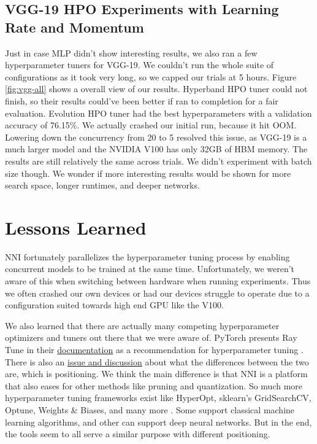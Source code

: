 \documentclass{article}
\begin{document}
\subsection{VGG-19 HPO Experiments with Learning Rate and Momentum}
Just in case MLP didn't show interesting results, we also ran a few hyperparameter tuners for VGG-19. We couldn't run the whole suite of configurations as it took very long, so we capped our trials at 5 hours. Figure \ref{fig:vgg-all} shows a overall view of our results. Hyperband HPO tuner could not finish, so their results could've been better if ran to completion for a fair evaluation. Evolution HPO tuner had the best hyperparameters with a validation accuracy of 76.15\%. We actually crashed our initial run, because it hit OOM. Lowering down the concurrency from 20 to 5 resolved this issue, as VGG-19 is a much larger model and the NVIDIA V100 has only 32GB of HBM memory. The results are still relatively the same across trials. We didn't experiment with batch size though. We wonder if more interesting results would be shown for more search space, longer runtimes, and deeper networks.

\section{Lessons Learned}
NNI fortunately parallelizes the hyperparameter tuning process by enabling concurrent models to be trained at the same time. Unfortunately, we weren't aware of this when switching between hardware when running experiments. Thus we often crashed our own devices or had our devices struggle to operate due to a configuration suited towards high end GPU like the V100.

We also learned that there are actually many competing hyperparameter optimizers and tuners out there that we were aware of. PyTorch presents Ray Tune in their \href{https://pytorch.org/tutorials/beginner/hyperparameter_tuning_tutorial.html}{documentation} as a recommendation for hyperparameter tuning \cite{ray-tune}. There is also an \href{https://github.com/microsoft/nni/issues/1743}{issue and discussion} about what the differences between the two are, which is positioning. We think the main difference is that NNI is a platform that also eases for other methods like pruning and quantization. So much more hyperparameter tuning frameworks exist like HyperOpt, sklearn's GridSearchCV, Optune, Weights \& Biases, and many more \cite{hyperopt, sklearn_api, optuna}. Some support classical machine learning algorithms, and other can support deep neural networks. But in the end, the tools seem to all serve a similar purpose with different positioning.
\end{document}
